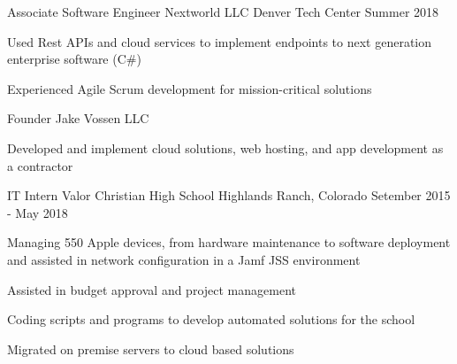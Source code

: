 

\begin{cventries}

  \cventry
    {Associate Software Engineer} %
    {Nextworld LLC} %
    {Denver Tech Center} %
    {Summer 2018} %
    {
      \begin{cvitems} %
        \item {Used Rest APIs and cloud services to implement
            endpoints to next generation enterprise software (C\#)}
        \item {Experienced Agile Scrum development for mission-critical solutions}
      \end{cvitems}
    }

  \cventry
    {Founder}
    {Jake Vossen LLC} %
    {} %
    { }
    {
      \begin{cvitems} %
        \item {Developed and implement cloud solutions, web hosting,
            and app development as a contractor}
      \end{cvitems}
    }

  \cventry
    {IT Intern}
    {Valor Christian High School }
    {Highlands Ranch, Colorado} %
    {Setember 2015 - May 2018} %
    {
      \begin{cvitems} %
        \item {Managing 550 Apple devices, from hardware maintenance
            to software deployment and assisted in network
            configuration in a Jamf JSS environment}
        \item {Assisted in budget approval and project management}
        \item {Coding scripts and programs to develop automated
            solutions for the school}
        \item {Migrated on premise servers to cloud based solutions}
      \end{cvitems}
    }
\end{cventries}
